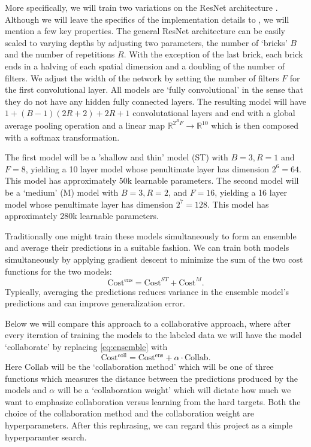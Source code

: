 \documentclass[english,a4paper,oneside]{amsart}
\theoremstyle{definition}
\begin{document}
More specifically, we will train two variations on the ResNet architecture \cite{ResNet}. Although we will leave the specifics of the implementation details to \cite{ResNet}, we will mention a few key properties. The general ResNet architecture can be easily scaled to varying depths by adjusting two parameters, the number of `bricks' $B$ and the number of repetitions $R$. With the exception of the last brick, each brick ends in a halving of each spatial dimension and a doubling of the number of filters. We adjust the width of the network by setting the number of filters $F$ for the first convolutional layer. All models are `fully convolutional' in the sense that they do not have any hidden fully connected layers. The resulting model will have $1+(B-1)(2R+2)+2R+1$ convolutational layers and end with a global average pooling operation and a linear map $\mathbb{R}^{2^B F} \to \mathbb{R}^{10}$ which is then composed with a softmax transformation. 

The first model will be a 'shallow and thin' model (ST) with $B=3, R=1$ and $F=8$, yielding a 10 layer model whose penultimate layer has dimension $2^{6}=64$.  This model has approximately 50k learnable parameters. The second model will be a `medium' (M) model with $B=3, R=2$, and $F=16$, yielding a 16 layer model whose penultimate layer has dimension $2^{7}=128$. This model has approximately 280k learnable parameters.  

Traditionally one might train these models simultaneously to form an ensemble and average their predictions in a suitable fashion. We can train both models simultaneously by applying gradient descent to minimize the sum of the two cost functions for the two models:
\begin{equation}\label{eq:ensemble}
 \mathrm{Cost^{ens}} = \mathrm{Cost}^{ST} + \mathrm{Cost}^{M}.
 \end{equation}
Typically, averaging the predictions reduces variance in the ensemble model's predictions and can improve generalization error. 

Below we will compare this approach to a collaborative approach, where after every iteration of training the models to the labeled data we will have the model `collaborate' by replacing \eqref{eq:ensemble} with 
\begin{equation}\label{eq:collab}
 \mathrm{Cost^{coll}} = \mathrm{Cost^{ens}} + \alpha \cdot \mathrm{Collab}.
\end{equation} 
Here $\mathrm{Collab}$ will be the `collaboration method' which will be one of three functions which measures the distance between the predictions produced by the models and $\alpha$ will be a `collaboration weight' which will dictate how much we want to emphasize collaboration versus learning from the hard targets. Both the choice of the collaboration method and the collaboration weight are hyperparameters. After this rephrasing, we can regard this project as a simple hyperparamter search.
\end{document}
